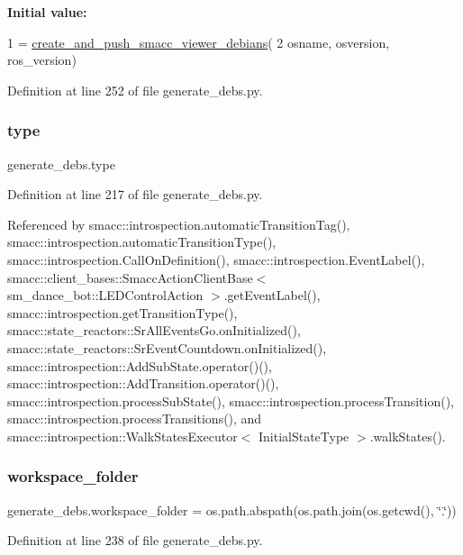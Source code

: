 {\bfseries Initial value\+:}
\begin{DoxyCode}
1 =  \hyperlink{namespacegenerate__debs_a9a6167ed98fbdc7b1e1c56da5652cf19}{create\_and\_push\_smacc\_viewer\_debians}(
2         osname, osversion, ros\_version)
\end{DoxyCode}


Definition at line 252 of file generate\+\_\+debs.\+py.

\mbox{\label{namespacegenerate__debs_a50bc9a7ecac9584553e089a448bcde58}} 
\subsubsection{\texorpdfstring{type}{type}}
{\footnotesize\ttfamily generate\+\_\+debs.\+type}



Definition at line 217 of file generate\+\_\+debs.\+py.



Referenced by smacc\+::introspection.\+automatic\+Transition\+Tag(), smacc\+::introspection.\+automatic\+Transition\+Type(), smacc\+::introspection.\+Call\+On\+Definition(), smacc\+::introspection.\+Event\+Label(), smacc\+::client\+\_\+bases\+::\+Smacc\+Action\+Client\+Base$<$ sm\+\_\+dance\+\_\+bot\+::\+L\+E\+D\+Control\+Action $>$.\+get\+Event\+Label(), smacc\+::introspection.\+get\+Transition\+Type(), smacc\+::state\+\_\+reactors\+::\+Sr\+All\+Events\+Go.\+on\+Initialized(), smacc\+::state\+\_\+reactors\+::\+Sr\+Event\+Countdown.\+on\+Initialized(), smacc\+::introspection\+::\+Add\+Sub\+State.\+operator()(), smacc\+::introspection\+::\+Add\+Transition.\+operator()(), smacc\+::introspection.\+process\+Sub\+State(), smacc\+::introspection.\+process\+Transition(), smacc\+::introspection.\+process\+Transitions(), and smacc\+::introspection\+::\+Walk\+States\+Executor$<$ Initial\+State\+Type $>$.\+walk\+States().

\mbox{\label{namespacegenerate__debs_acb69863b90257249a30e43ebacfb8bd8}} 
\subsubsection{\texorpdfstring{workspace\+\_\+folder}{workspace\_folder}}
{\footnotesize\ttfamily generate\+\_\+debs.\+workspace\+\_\+folder = os.\+path.\+abspath(os.\+path.\+join(os.\+getcwd(), \char`\"{}.\char`\"{}))}



Definition at line 238 of file generate\+\_\+debs.\+py.

